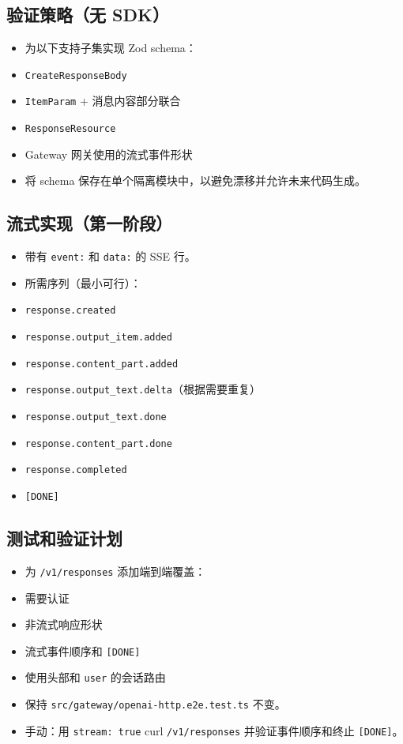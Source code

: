 \subsection{验证策略（无 SDK）}


\begin{itemize}
  \item 为以下支持子集实现 Zod schema：
  \item \texttt{CreateResponseBody}
  \item \texttt{ItemParam} + 消息内容部分联合
  \item \texttt{ResponseResource}
  \item Gateway 网关使用的流式事件形状
  \item 将 schema 保存在单个隔离模块中，以避免漂移并允许未来代码生成。
\end{itemize}


\subsection{流式实现（第一阶段）}


\begin{itemize}
  \item 带有 \texttt{event:} 和 \texttt{data:} 的 SSE 行。
  \item 所需序列（最小可行）：
  \item \texttt{response.created}
  \item \texttt{response.output\_item.added}
  \item \texttt{response.content\_part.added}
  \item \texttt{response.output\_text.delta}（根据需要重复）
  \item \texttt{response.output\_text.done}
  \item \texttt{response.content\_part.done}
  \item \texttt{response.completed}
  \item \texttt{[DONE]}
\end{itemize}


\subsection{测试和验证计划}


\begin{itemize}
  \item 为 \texttt{/v1/responses} 添加端到端覆盖：
  \item 需要认证
  \item 非流式响应形状
  \item 流式事件顺序和 \texttt{[DONE]}
  \item 使用头部和 \texttt{user} 的会话路由
  \item 保持 \texttt{src/gateway/openai-http.e2e.test.ts} 不变。
  \item 手动：用 \texttt{stream: true} curl \texttt{/v1/responses} 并验证事件顺序和终止 \texttt{[DONE]}。
\end{itemize}


